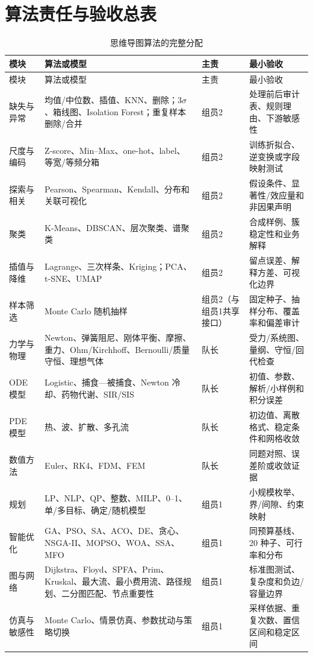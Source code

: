 \section{算法责任与验收总表}

\begin{longtable}{p{2.1cm}p{5.0cm}p{2.0cm}p{5.5cm}}
\caption{思维导图算法的完整分配}\label{tab:algorithm-owner}\\
\toprule
模块 & 算法或模型 & 主责 & 最小验收\\
\midrule
\endfirsthead
\toprule
模块 & 算法或模型 & 主责 & 最小验收\\
\midrule
\endhead
缺失与异常 & 均值/中位数、插值、KNN、删除；$3\sigma$、箱线图、Isolation Forest；重复样本删除/合并 & 组员2 & 处理前后审计表、规则理由、下游敏感性\\
尺度与编码 & Z-score、Min--Max、one-hot、label、等宽/等频分箱 & 组员2 & 训练折拟合、逆变换或字段映射测试\\
探索与相关 & Pearson、Spearman、Kendall、分布和关联可视化 & 组员2 & 假设条件、显著性/效应量和非因果声明\\
聚类 & K-Means、DBSCAN、层次聚类、谱聚类 & 组员2 & 合成样例、簇稳定性和业务解释\\
插值与降维 & Lagrange、三次样条、Kriging；PCA、t-SNE、UMAP & 组员2 & 留点误差、解释方差、可视化边界\\
样本筛选 & Monte Carlo 随机抽样 & 组员2（与组员1共享接口） & 固定种子、抽样分布、覆盖率和偏差审计\\
力学与物理 & Newton、弹簧阻尼、刚体平衡、摩擦、重力、Ohm/Kirchhoff、Bernoulli/质量守恒、理想气体 & 队长 & 受力/系统图、量纲、守恒/回代检查\\
ODE 模型 & Logistic、捕食—被捕食、Newton 冷却、药物代谢、SIR/SIS & 队长 & 初值、参数、解析/小样例和积分误差\\
PDE 模型 & 热、波、扩散、多孔流 & 队长 & 初边值、离散格式、稳定条件和网格收敛\\
数值方法 & Euler、RK4、FDM、FEM & 队长 & 同题对照、误差阶或收敛证据\\
规划 & LP、NLP、QP、整数、MILP、0--1、单/多目标、确定/随机模型 & 组员1 & 小规模枚举、界/间隙、约束映射\\
智能优化 & GA、PSO、SA、ACO、DE、贪心、NSGA-II、MOPSO、WOA、SSA、MFO & 组员1 & 同预算基线、20 种子、可行率和分布\\
图与网络 & Dijkstra、Floyd、SPFA、Prim、Kruskal、最大流、最小费用流、路径规划、二分图匹配、节点重要性 & 组员1 & 标准图测试、复杂度和负边/容量边界\\
仿真与敏感性 & Monte Carlo、情景仿真、参数扰动与策略切换 & 组员1 & 采样依据、重复次数、置信区间和稳定区间\\

\end{longtable}
